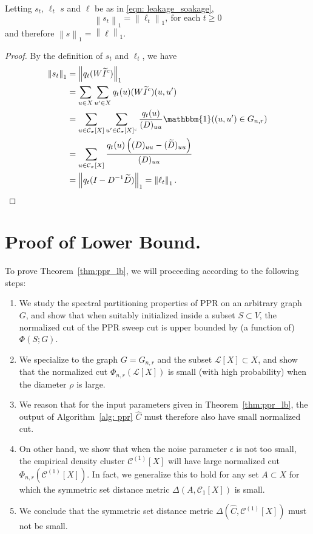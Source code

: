 \documentclass[11pt,twoside]{article}
\newcommand{\norm}[1]{\left\lVert#1\right\rVert}
\newcommand{\1}{\mathbbm{1}}
\newcommand{\Xbf}{X}
\newcommand{\Wbf}{W}
\newcommand{\Dbf}{D}
\newcommand{\Ibf}[1]{I_{#1}}
\newcommand{\Cset}{\mathcal{C}}
\newcommand{\Csig}{\Cset_{\sigma}}
\newcommand{\Cest}{\widehat{C}}
\begin{document}
\begin{lemma}
	\label{lem: total_leakage_equal_total_soakage}
	Letting $s_t$, $\ell_t$ $s$ and $\ell$ be as in \eqref{eqn: leakage_soakage},
	\begin{equation*}
	\norm{s_t}_1 = \norm{\ell_t}_1,~ \textrm{for each $t \geq 0$}
	\end{equation*}
	and therefore $\norm{s}_1 = \norm{\ell}_1$. 
\end{lemma}
\begin{proof}
	By the definition of $s_t$ and $\ell_t$, we have
	\begin{align*}
	\norm{s_t}_1 & = \norm{q_t (\Wbf \widetilde{I}^c)}_1 \\
	& = \sum_{u \in \Xbf} \sum_{u' \in \Xbf} q_t(u) (\Wbf \widetilde{I}^c)(u, u') \\
	& = \sum_{u \in\Csig[\Xbf]} \sum_{u' \in \Csig[\Xbf]^c} \frac{q_t(u)}{(\Dbf)_{uu}} \1((u,u') \in G_{n,r}) \\
	& = \sum_{u \in \Csig[\Xbf]} \frac{q_t(u) \left((\Dbf)_{uu} - (\widetilde{\Dbf})_{uu} \right)}{(\Dbf)_{uu}} \\
	& = \norm{q_t (\Ibf{} - \Dbf^{-1} \widetilde{\Dbf})}_1 = \norm{\ell_t}_1.
	\end{align*}
\end{proof}

\section{Proof of Lower Bound.}

To prove Theorem~\ref{thm:ppr_lb}, we will proceeding according to the following steps:
\begin{enumerate}
	\item We study the spectral partitioning properties of PPR on an arbitrary graph $G$, and show that when suitably initialized inside a subset $S \subset V$, the normalized cut of the PPR sweep cut is upper bounded by (a function of) $\Phi(S;G)$. 
	\item We specialize to the graph $G = G_{n,r}$ and the subset $\mathcal{L}[\Xbf] \subset \Xbf$, and show that the normalized cut $\Phi_{n,r}(\mathcal{L}[\Xbf])$ is small (with high probability) when the diameter $\rho$ is large.
	\item We reason that for the input parameters given in Theorem~\ref{thm:ppr_lb}, the output of Algorithm~\ref{alg: ppr} $\Cest$ must therefore also have small normalized cut.
	\item On other hand, we show that when the noise parameter $\epsilon$ is not too small, the empirical density cluster $\Cset^{(1)}[\Xbf]$ will have large normalized cut $\Phi_{n,r}(\Cset^{(1)}[\Xbf])$. In fact, we generalize this to hold for any set $A \subset \Xbf$ for which the symmetric set distance metric $\Delta(A,\Cset_1[\Xbf])$ is small.
	\item We conclude that the symmetric set distance metric $\Delta(\Cest,\Cset^{(1)}[\Xbf])$ must not be small.
\end{enumerate}
\end{document}
